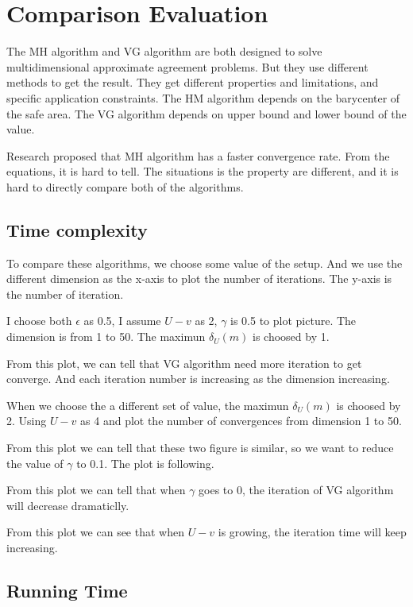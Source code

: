 \section{Comparison Evaluation}
The MH algorithm and VG algorithm are both designed to solve
multidimensional approximate agreement problems. But they use
different methods to get the result. They get different properties
and limitations, and specific application constraints. The HM
algorithm depends on the barycenter of the safe area. The VG
algorithm depends on upper bound and lower bound of the value.

Research proposed that MH algorithm has a faster convergence rate.
From the equations, it is hard to tell. The situations is the
property are different, and it is hard to directly compare both
of the algorithms. 

\subsection{Time complexity}
To compare these algorithms, we choose some value of the setup.
And we use the different dimension as the x-axis to plot the 
number of iterations. The y-axis is the number of iteration.

I choose both $\epsilon$ as 0.5, I assume
$U - v$ as 2, $\gamma$ is 0.5 to plot picture. The dimension is
from 1 to 50. The maximun $\delta_{U}(m)$ is choosed by 1.



From this plot, we can tell that VG algorithm need more iteration
to get converge. And each iteration number is increasing as the 
dimension increasing.

When we choose the a different set of value, the maximun $\delta_{U}(m)$ is choosed by 2.
Using $U - v$ as 4 and plot the number of convergences from
dimension 1 to 50.



From this plot we can tell that these two figure is similar, so we 
want to reduce the value of $\gamma$ to 0.1. The plot is following.



From this plot we can tell that when $\gamma$ goes to 0, the iteration
of VG algorithm will decrease dramaticlly.



From this plot we can see that when $U - v$ is growing, the iteration
time will keep increasing. 

\subsection{Running Time}
